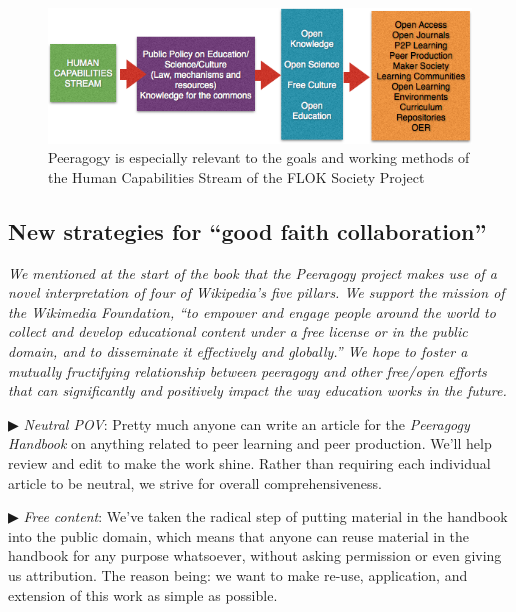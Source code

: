 \begin{figure}
\includegraphics[width=\textwidth]{../pictures/flok2.png}
\caption*{Peeragogy is especially relevant to the goals and working methods of the Human Capabilities Stream of the FLOK Society Project}
\end{figure}

\clearpage

\begin{mdframed}
\label{good-faith-collaboration}
\subsection{New strategies for ``good faith collaboration''}

\noindent \emph{We mentioned at the start of the book that the
  Peeragogy project makes use of a novel interpretation of four of
  Wikipedia's five pillars.  We support the mission of the Wikimedia
  Foundation, ``to empower and engage people around the world to
  collect and develop educational content under a free license or in
  the public domain, and to disseminate it effectively and globally.''
  We hope to foster a mutually fructifying relationship between
  peeragogy and other free/open efforts that can significantly and
  positively impact the way education works in the future.}

▶ \emph{Neutral POV}: Pretty much anyone can write an article for the
\emph{Peeragogy Handbook} on anything related to peer learning and
peer production.  We'll help review and edit to make the work shine.
Rather than requiring each individual article to be neutral, we strive
for overall comprehensiveness.

▶ \emph{Free content}: We've taken the radical step of putting
material in the handbook into the public domain, which means that
anyone can reuse material in the handbook for any purpose whatsoever,
without asking permission or even giving us attribution.  The reason
being: we want to make re-use, application, and extension of this work
as simple as possible.


\end{mdframed}
